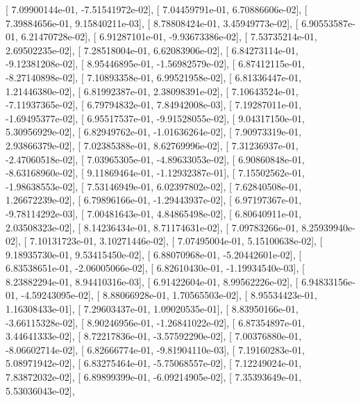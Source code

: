 \documentclass{article}
\begin{document}
       [  7.09900144e-01,  -7.51541972e-02],
       [  7.04459791e-01,   6.70886606e-02],
       [  7.39884656e-01,   9.15840211e-03],
       [  8.78808424e-01,   3.45949773e-02],
       [  6.90553587e-01,   6.21470728e-02],
       [  6.91287101e-01,  -9.93673386e-02],
       [  7.53735214e-01,   2.69502235e-02],
       [  7.28518004e-01,   6.62083906e-02],
       [  6.84273114e-01,  -9.12381208e-02],
       [  8.95446895e-01,  -1.56982579e-02],
       [  6.87412115e-01,  -8.27140898e-02],
       [  7.10893358e-01,   6.99521958e-02],
       [  6.81336447e-01,   1.21446380e-02],
       [  6.81992387e-01,   2.38098391e-02],
       [  7.10643524e-01,  -7.11937365e-02],
       [  6.79794832e-01,   7.84942008e-03],
       [  7.19287011e-01,  -1.69495377e-02],
       [  6.95517537e-01,  -9.91528055e-02],
       [  9.04317150e-01,   5.30956929e-02],
       [  6.82949762e-01,  -1.01636264e-02],
       [  7.90973319e-01,   2.93866379e-02],
       [  7.02385388e-01,   8.62769996e-02],
       [  7.31236937e-01,  -2.47060518e-02],
       [  7.03965305e-01,  -4.89633053e-02],
       [  6.90860848e-01,  -8.63168960e-02],
       [  9.11869464e-01,  -1.12932387e-01],
       [  7.15502562e-01,  -1.98638553e-02],
       [  7.53146949e-01,   6.02397802e-02],
       [  7.62840508e-01,   1.26672239e-02],
       [  6.79896166e-01,  -1.29443937e-02],
       [  6.97197367e-01,  -9.78114292e-03],
       [  7.00481643e-01,   4.84865498e-02],
       [  6.80640911e-01,   2.03508323e-02],
       [  8.14236434e-01,   8.71174631e-02],
       [  7.09783266e-01,   8.25939940e-02],
       [  7.10131723e-01,   3.10271446e-02],
       [  7.07495004e-01,   5.15100638e-02],
       [  9.18935730e-01,   9.53415450e-02],
       [  6.88070968e-01,  -5.20442601e-02],
       [  6.83538651e-01,  -2.06005066e-02],
       [  6.82610430e-01,  -1.19934540e-03],
       [  8.23882294e-01,   8.94410316e-03],
       [  6.91422604e-01,   8.99562226e-02],
       [  6.94833156e-01,  -4.59243095e-02],
       [  8.88066928e-01,   1.70565503e-02],
       [  8.95534423e-01,   1.16308433e-01],
       [  7.29603437e-01,   1.09020535e-01],
       [  8.83950166e-01,  -3.66115328e-02],
       [  8.90246956e-01,  -1.26841022e-02],
       [  6.87354897e-01,   3.44641333e-02],
       [  8.72217836e-01,  -3.57592290e-02],
       [  7.00376880e-01,  -8.06602714e-02],
       [  6.82666774e-01,  -9.81904110e-03],
       [  7.19160283e-01,   5.08971942e-02],
       [  6.83275464e-01,  -5.75068557e-02],
       [  7.12249024e-01,   7.83872032e-02],
       [  6.89899399e-01,  -6.09214905e-02],
       [  7.35393649e-01,   5.53036043e-02],
\end{document}
